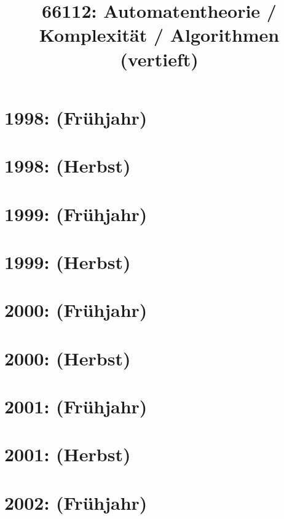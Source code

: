 \documentclass{lehramt-informatik-haupt}
\title{66112: Automatentheorie / Komplexität / Algorithmen (vertieft)}
\begin{document}
\maketitle
\tableofcontents

\section{1998: (Frühjahr)}


\section{1998: (Herbst)}


\section{1999: (Frühjahr)}


\section{1999: (Herbst)}


\section{2000: (Frühjahr)}


\section{2000: (Herbst)}


\section{2001: (Frühjahr)}


\section{2001: (Herbst)}


\section{2002: (Frühjahr)}

\end{document}

